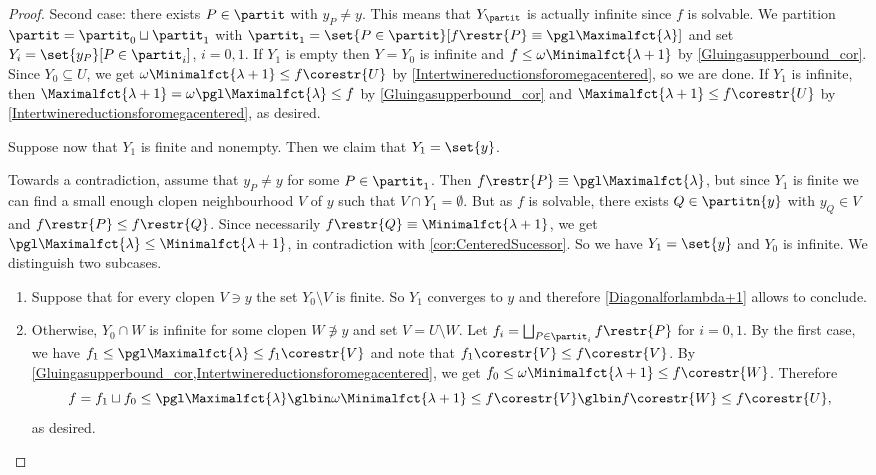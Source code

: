 \begin{proof}
\smallskip

Second case: there exists $P\in \partit$ with $y_P\neq y$. This means that $Y_\partit$ is actually infinite since $f$ is solvable.
We partition $\partit=\partit_0\sqcup\partit_1$ with $\partit_1=\set{P\in\partit}[f\restr{P}\equiv\pgl\Maximalfct{\lambda}]$ and set $Y_i=\set{y_P}[P\in\partit_i]$, $i=0,1$.
If $Y_1$ is empty then $Y=Y_0$ is infinite and $f\leq \omega\Minimalfct{\lambda+1}$ by \cref{Gluingasupperbound_cor}. Since $Y_0\subseteq U$, we get $\omega\Minimalfct{\lambda+1}\leq f\corestr{U}$ by \cref{Intertwinereductionsforomegacentered}, so we are done. If $Y_1$ is infinite, then $\Maximalfct{\lambda+1}=\omega \pgl \Maximalfct{\lambda} \leq f$ by \cref{Gluingasupperbound_cor} and $\Maximalfct{\lambda+1} \leq f\corestr{U}$ by \cref{Intertwinereductionsforomegacentered}, as desired. 

Suppose now that $Y_1$ is finite and nonempty. Then we claim that $Y_1=\set{y}$.  

Towards a contradiction, assume that $y_P\neq y$ for some $P\in \partit_1$. Then $f\restr{P}\equiv \pgl\Maximalfct{\lambda}$, but since $Y_1$ is finite we can find a small enough clopen neighbourhood $V$ of $y$ such that $V\cap Y_1=\emptyset$. But as $f$ is solvable, there exists $Q\in\partitn{y}$ with $y_Q\in V$ and $f\restr{P}\leq f\restr{Q}$. Since necessarily $f\restr{Q}\equiv \Minimalfct{\lambda+1}$, we get $\pgl\Maximalfct{\lambda}\leq \Minimalfct{\lambda+1}$, in contradiction with \cref{cor:CenteredSucessor}.
So we have $Y_1=\set{y}$ and $Y_0$ is infinite. We distinguish two subcases.
\begin{enumerate}
\item Suppose that for every clopen $V\ni y$ the set $Y_0\setminus V$ is finite. So $Y_1$ converges to $y$ and therefore \cref{Diagonalforlambda+1} allows to conclude.
\item Otherwise, $Y_0\cap W$ is infinite for some clopen $W\notni y$ and set $V=U\setminus W$. Let $f_i=\bigsqcup_{P\in \partit_i}f\restr{P}$ for $i=0,1$. By the first case, we have $f_1\leq \pgl \Maximalfct{\lambda}\leq f_1\corestr{V}$ and note that $f_1\corestr{V}\leq f\corestr{V}$. By \cref{Gluingasupperbound_cor,Intertwinereductionsforomegacentered}, we get $f_0\leq \omega\Minimalfct{\lambda+1}\leq f\corestr{W}$. Therefore
\[
f=f_1\sqcup f_0 \leq \pgl \Maximalfct{\lambda} \glbin \omega\Minimalfct{\lambda+1} \leq f\corestr{V}\glbin f\corestr{W}\leq f\corestr{U},
\]
as desired.\qedhere
\end{enumerate}
\end{proof}


